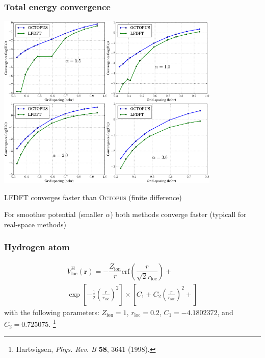 \documentclass[10pt,t]{beamer}
\begin{document}
\begin{frame}
\frametitle{Total energy convergence}

{\centering
\includegraphics[width=0.8\textwidth]{images/COMBINE_v1.pdf}
\par
LFDFT converges faster than \textsc{Octopus} (finite difference)
\par
For smoother potential (smaller $\alpha$) both methods converge faster
(typicall for real-space methods)
\par}

\end{frame}



\begin{frame}
\frametitle{Hydrogen atom}

\begin{multline}
  V^{\mathrm{H}}_{\mathrm{loc}}(\mathbf{r}) = 
  -\dfrac{Z_{\mathrm{ion}}}{r}
  \mathrm{erf}\left(
  \dfrac{r}{\sqrt{2}r_{\mathrm{loc}}}
  \right) + \\
  \exp
  \left[ -\frac{1}{2}
  \left( \frac{r}{r_{\mathrm{loc}}}\right)^2
  \right]
  \times
  \left[
  C_{1} +
  C_{2}\left( \frac{r}{r_{\mathrm{loc}}}\right)^2 +
\right]
\end{multline}
with the following parameters:
$Z_{\mathrm{ion}} = 1$, $r_{\mathrm{loc}} = 0.2$,
$C_{1} = -4.1802372$, and $C_{2} = 0.725075$.
\footnote{
  Hartwigsen, \textit{Phys. Rev. B}  \textbf{58}, 3641 (1998). 
}

\end{frame}
\end{document}
